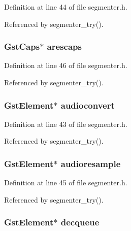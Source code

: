 \-Definition at line 44 of file segmenter.\-h.



\-Referenced by segmenter\-\_\-try().

\hypertarget{struct__audio__bag_a740ee81301820a0ab68d91c9f96a9f75}{
\subsubsection[{arescaps}]{\setlength{\rightskip}{0pt plus 5cm}\-Gst\-Caps$\ast$ {\bf arescaps}}}\label{struct__audio__bag_a740ee81301820a0ab68d91c9f96a9f75}


\-Definition at line 46 of file segmenter.\-h.



\-Referenced by segmenter\-\_\-try().

\hypertarget{struct__audio__bag_a5c648b7312b292946b43b94d35c5aeef}{
\subsubsection[{audioconvert}]{\setlength{\rightskip}{0pt plus 5cm}\-Gst\-Element$\ast$ {\bf audioconvert}}}\label{struct__audio__bag_a5c648b7312b292946b43b94d35c5aeef}


\-Definition at line 43 of file segmenter.\-h.



\-Referenced by segmenter\-\_\-try().

\hypertarget{struct__audio__bag_ab3ae963e4ecb268062c0408e1046603f}{
\subsubsection[{audioresample}]{\setlength{\rightskip}{0pt plus 5cm}\-Gst\-Element$\ast$ {\bf audioresample}}}\label{struct__audio__bag_ab3ae963e4ecb268062c0408e1046603f}


\-Definition at line 45 of file segmenter.\-h.



\-Referenced by segmenter\-\_\-try().

\hypertarget{struct__audio__bag_a60c8bc4118567d2ebc6ae53bca576f93}{
\subsubsection[{decqueue}]{\setlength{\rightskip}{0pt plus 5cm}\-Gst\-Element$\ast$ {\bf decqueue}}}\label{struct__audio__bag_a60c8bc4118567d2ebc6ae53bca576f93}


